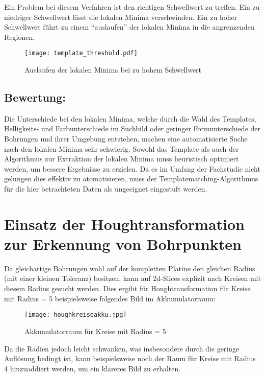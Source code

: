 Ein Problem bei diesem Verfahren ist den richtigen Schwellwert zu treffen. Ein zu niedriger Schwellwert lässt die lokalen Minima verschwinden. Ein zu hoher Schwellwert führt zu einem "`auslaufen"' der lokalen Minima in die angrenzenden Regionen.
\begin{figure}[H]
  \begin{center}
    \texttt{[image: template\_threshold.pdf]}
    \caption{Auslaufen der lokalen Minima bei zu hohem Schwellwert}
    \label{fig:localminima_threshold_bad}
  \end{center}
\end{figure}

\subsection{Bewertung:}
Die Unterschiede bei den lokalen Minima, welche durch die Wahl des Templates, Helligkeits- und Farbunterschiede im Suchbild oder geringer Formunterschiede der Bohrungen und ihrer Umgebung entstehen, machen eine automatisierte Suche nach den lokalen Minima sehr schwierig. Sowohl das Template als auch der Algorithmus zur Extraktion der lokalen Minima muss heuristisch optimiert werden, um bessere Ergebnisse zu erzielen. Da es im Umfang der Fachstudie nicht gelungen dies effektiv zu atomatisieren, muss der Templatematching-Algorithmus für die hier betrachteten Daten als ungeeignet eingestuft werden.


\section{Einsatz der Houghtransformation zur Erkennung von Bohrpunkten}
Da gleichartige Bohrungen wohl auf der kompletten Platine den gleichen Radius (mit einer kleinen Toleranz) besitzen, kann auf 2d-Slices explizit nach Kreisen mit diesem Radius gesucht werden. Dies ergibt für Houghtransformation für Kreise mit Radius = 5 beispielsweise folgendes Bild im Akkumulatorraum:

\begin{figure}[H]
  \begin{center}
    \texttt{[image: houghkreiseakku.jpg]}
    \caption{Akkumulatorraum für Kreise mit Radius = 5}
    \label{fig:houghkreiseakku}
  \end{center}
\end{figure}

Da die Radien jedoch leicht schwanken, was insbesondere durch die geringe Auflösung bedingt ist, kann beispielsweise noch der Raum für Kreise mit Radius 4 hinzuaddiert werden, um ein klareres Bild zu erhalten. 


